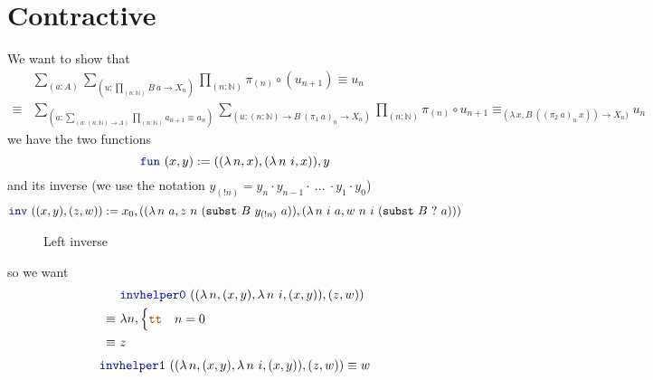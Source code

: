 \documentclass[twoside,11pt,openright]{report}
\theoremstyle{plain} %
\theoremstyle{definition}
\theoremstyle{remark}
\newcommand*{\constant}[1]{\textcolor{orange!60!black}{\ensuremath{\mathtt{#1}}}}
\newcommand*{\function}[1]{\textcolor{blue!60!black}{\ensuremath{\mathtt{#1}}}}
\begin{document}
\chapter{Contractive}
We want to show that
\begin{align}
  &\sum_{(a : A)} \sum_{(u : \prod_{(n : \mathbb{N})} B~a \rightarrow X_n)} \prod_{(n : \mathbb{N})} \pi_{(n)} \circ (u_{n + 1}) \equiv u_n \\
  \equiv& \sum_{(a : \sum_{(a : (n : \mathbb{N}) \rightarrow A)} \prod_{(n : \mathbb{N})} a_{n+1} \equiv a_n)} \sum_{(u : (n : \mathbb{N}) \rightarrow B~(\pi_1~a)_n \rightarrow X_n)} \prod_{(n : \mathbb{N})} \pi_{(n)} \circ u_{n+1} \equiv_{(\lambda\,x, B~((\pi_2~a)_n~x)) \rightarrow X_n)} u_n
\end{align}
we have the two functions
\begin{equation}
  \function{fun}~(x , y) := ((\lambda\,n, x) , (\lambda\,n~i, x)) , y
\end{equation}
and its inverse (we use the notation \(y_{(!n)} = y_{n} \cdot y_{n-1} \cdot ~\dots~ \cdot y_1 \cdot y_0\))
\begin{equation}
  \function{inv}~((x , y) , (z , w)) := x_0 , ((\lambda\,n~a , z~n~(\mathtt{subst}~B~y_{(!n)}~a)) , (\lambda\,n~i~a, w~n~i~(\mathtt{subst}~B~?~a)))
\end{equation}

\begin{figure}[h]
  \centering
  \caption{Left inverse}
  \label{fig:contractive}
\end{figure}

so we want
\begin{align}
  &~\function{invhelper0}~((\lambda\,n, (x , y) , \lambda\,n~i, (x , y)) , (z , w)) \\
  \equiv&~\lambda n, \begin{cases} \constant{tt} & n = 0 \\  \end{cases} \\
  \equiv&~z
\end{align}
\begin{equation}
  \function{invhelper1}~((\lambda\,n, (x , y) , \lambda\,n~i, (x , y)) , (z , w)) \equiv w
\end{equation}
\end{document}
